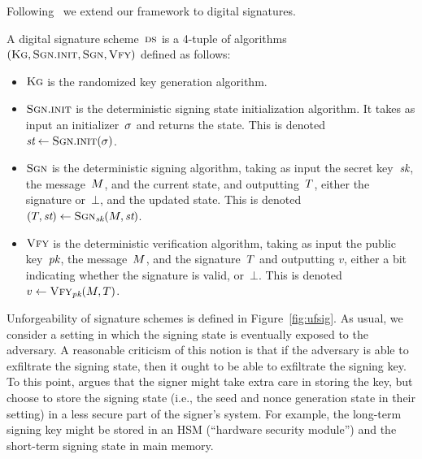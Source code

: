 %
%
%
Following~\cite{bellare2016nonce} we extend our framework to digital signatures.
\begin{definition}[DS]\rm
  A digital signature scheme~$\textsc{ds}$ is a 4-tuple of algorithms $(\textsc{Kg},\\ \textsc{Sgn}.\textsc{init}, \textsc{Sgn},
  \textsc{Vfy})$ defined as follows:
  \begin{itemize}
    \item $\textsc{Kg}$ is the randomized key generation algorithm.

    \item $\textsc{Sgn}.\textsc{init}$ is the deterministic signing state initialization
      algorithm. It takes as input an initializer~$\sigma$ and returns the
      state. This is denoted $\textit{st} \gets \textsc{Sgn}.\textsc{init}(\sigma)$.

    \item $\textsc{Sgn}$ is the deterministic signing algorithm, taking as input the
      secret key~$\textit{sk}$, the message~$M$, and the current state, and
      outputting~$T$, either the signature or~$\bot$, and the updated state.
      This is denoted $(T, \textit{st}) \gets \textsc{Sgn}_{\textit{sk}}(M, \textit{st})$.

    \item $\textsc{Vfy}$ is the deterministic verification algorithm, taking as input the
      public key~$\textit{pk}$, the message~$M$, and the signature~$T$ and
      outputting $v$, either a bit indicating whether the signature is valid,
      or~$\bot$. This is denoted $v \gets \textsc{Vfy}_{\textit{pk}}(M, T)$.
  \end{itemize}
  \dqed
\end{definition}

%
Unforgeability of signature schemes is defined in Figure~\ref{fig:ufsig}. As
usual, we consider a setting in which the signing state is eventually exposed to
the adversary.
%
A reasonable criticism of this notion is that if the adversary is able to
exfiltrate the signing state, then it ought to be able to exfiltrate the signing
key. To this point, \cite{bellare2016nonce} argues that the signer might take
extra care in storing the key, but choose to store the signing state (i.e., the
seed and nonce generation state in their setting) in a less secure part of the
signer's system. For example, the long-term signing key might be stored in an
HSM (``hardware security module'') and the short-term signing state in main
memory.
%

